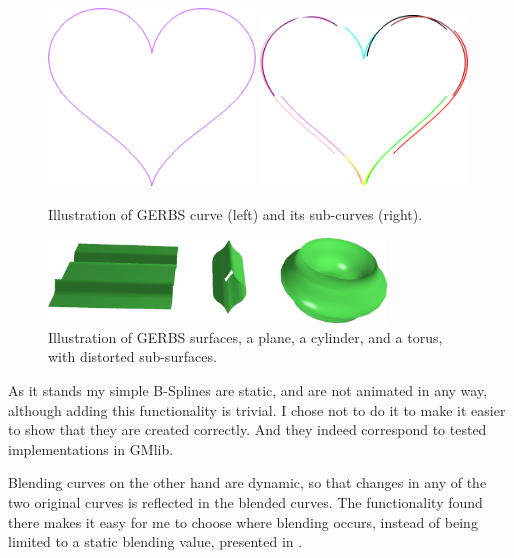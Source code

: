 \documentclass[a4paper,12pt]{extarticle}
\begin{document}
\begin{figure}[H]
  \centering
  \includegraphics[width=0.49\textwidth]{GERBSCurve.png}
  \includegraphics[width=0.49\textwidth]{LocalCurves.png}
  \caption{Illustration of GERBS curve (left) and its sub-curves (right).}
  \label{fig:GERBSCurve}
\end{figure}

\begin{figure}[H]
\centering
\includegraphics[width=0.8\textwidth]{GERBSSurfaces.png}
\caption{Illustration of GERBS surfaces, a plane, a cylinder, and a torus, with distorted sub-surfaces.}
\label{fig:GERBSSurface}
\end{figure}

As it stands my simple B-Splines are static, and are not animated in any way, although adding this functionality is trivial. I chose not to do it to make it easier to show that they are created correctly. And they indeed correspond to tested implementations in GMlib.

Blending curves on the other hand are dynamic, so that changes in any of the two original curves is reflected in the blended curves. The functionality found there makes it easy for me to choose where blending occurs, instead of being limited to a static blending value, presented in \citep[Chapter 6.2.2]{Laksa2012}.
\end{document}
